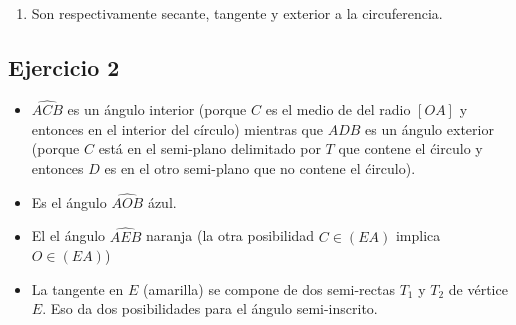 \begin{enumerate}
\begin{center}
\begin{tikzpicture}
    \end{tikzpicture}
\end{center}

\item Son respectivamente secante, tangente y exterior a la circuferencia.

    \begin{center}
\end{center}

\end{enumerate}

\subsection{Ejercicio 2}

\begin{itemize}
\item $\widehat{ACB}$ es un ángulo interior (porque $C$ es el medio de del radio
  $[OA]$ y entonces en el interior del círculo) mientras que
  $\widehat{ADB}$ es un ángulo exterior (porque $C$ está en el semi-plano
  delimitado por $T$ que contene el ćirculo y entonces $D$ es en el otro
  semi-plano que no contene el ćirculo).
\item Es el ángulo $\widehat{AOB}$ ázul.
\item El el ángulo $\widehat{AEB}$ naranja (la otra posibilidad
  $C \in (EA)$ implica $O \in (EA)$)
\item La tangente en $E$ (amarilla) se compone de dos semi-rectas $T_1$ y $T_2$
  de vértice $E$. Eso da dos posibilidades para el ángulo semi-inscrito.
\end{itemize}


